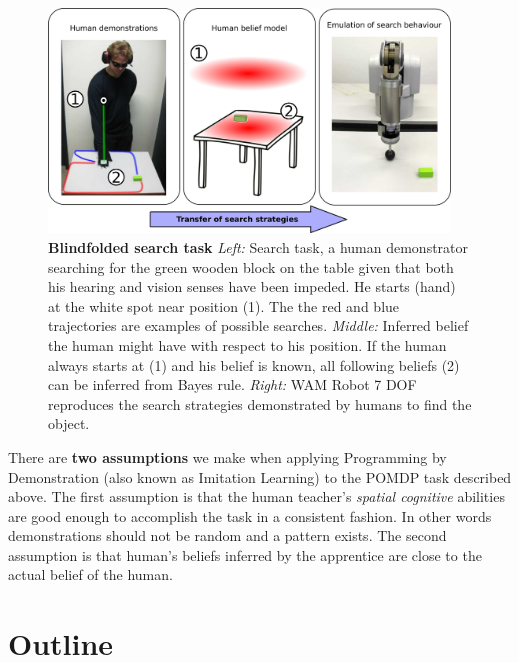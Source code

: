 \begin{figure}[h]
  \centering
  \includegraphics[width=0.95\textwidth]{./ch3-Search/Figures/Figure1.pdf}
  \caption{\textbf{Blindfolded search task} \textit{Left:}  Search task, a human demonstrator searching for the green wooden block on the table given
  that both his hearing and vision senses have been impeded. He starts (hand) at the white spot near position (1). The the red and blue trajectories 
  are examples of possible searches.
  \textit{Middle:} Inferred belief the human might have with respect to his position. If the human always starts at (1) and his belief is known, all 
  following beliefs (2) can be inferred from Bayes rule. \textit{Right:} WAM Robot 7 DOF
  reproduces the search strategies demonstrated by humans to find the object.}
 \label{fig:searching}
\end{figure} 

There are \textbf{two assumptions} we make when applying Programming by Demonstration (also known as Imitation Learning) to the POMDP task described above. 
The first assumption is that the human teacher's \textit{spatial cognitive} abilities are good enough to accomplish 
the task in a consistent fashion. In other words demonstrations should not be random and a pattern exists. The second assumption is that human's beliefs inferred  
by the apprentice are close to the actual belief of the human. 

\section{Outline}

